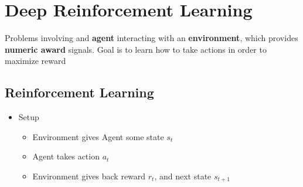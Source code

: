 \section{Deep Reinforcement Learning}
Problems involving and \textbf{agent} interacting with an \textbf{environment}, which provides \textbf{numeric award} signals. Goal is to learn how to take actions in order to maximize reward

\subsection{Reinforcement Learning}
\begin{itemize}
	\item Setup
	\begin{itemize}
		\item Environment gives Agent some state $s_t$
		\item Agent takes action $a_t$
		\item Environment gives back reward $r_t$, and next state $s_{t+1}$
	\end{itemize}
	
\end{itemize}

